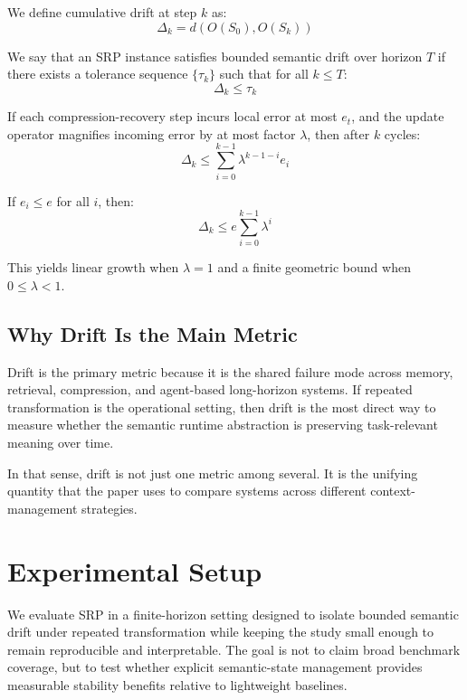 \documentclass[11pt]{article}
\begin{document}
We define cumulative drift at step $k$ as:
\begin{equation}
\Delta_k = d(O(S_0), O(S_k))
\end{equation}

We say that an SRP instance satisfies bounded semantic drift over horizon $T$ if there exists a tolerance sequence $\{\tau_k\}$ such that for all $k \le T$:
\begin{equation}
\Delta_k \le \tau_k
\end{equation}

If each compression-recovery step incurs local error at most $e_t$, and the update operator magnifies incoming error by at most factor $\lambda$, then after $k$ cycles:
\begin{equation}
\Delta_k \le \sum_{i=0}^{k-1} \lambda^{k-1-i} e_i
\end{equation}

If $e_i \le e$ for all $i$, then:
\begin{equation}
\Delta_k \le e \sum_{i=0}^{k-1} \lambda^i
\end{equation}

This yields linear growth when $\lambda = 1$ and a finite geometric bound when $0 \le \lambda < 1$.

\subsection{Why Drift Is the Main Metric}

Drift is the primary metric because it is the shared failure mode across memory, retrieval, compression, and agent-based long-horizon systems. If repeated transformation is the operational setting, then drift is the most direct way to measure whether the semantic runtime abstraction is preserving task-relevant meaning over time.

In that sense, drift is not just one metric among several. It is the unifying quantity that the paper uses to compare systems across different context-management strategies.

\section{Experimental Setup}
We evaluate SRP in a finite-horizon setting designed to isolate bounded semantic drift under repeated transformation while keeping the study small enough to remain reproducible and interpretable. The goal is not to claim broad benchmark coverage, but to test whether explicit semantic-state management provides measurable stability benefits relative to lightweight baselines.
\end{document}
